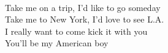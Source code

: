 \\
Take me on a trip, I'd like to go someday \\
Take me to New York, I'd love to see L.A. \\
I really want to come kick it with you \\
You'll be my American boy\\
\\
